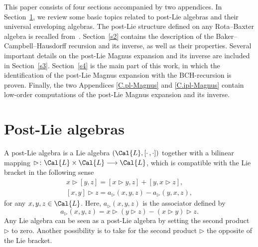 \documentclass[10pt,a4paper]{amsart}
\numberwithin{equation}{section}
\begin{document}
This paper consists of four sections accompanied by two appendices. In Section~\ref{s1}, we review some basic topics related to post-Lie algebras and their universal enveloping algebras. The post-Lie structure defined on any Rota--Baxter algebra is recalled from~\cite{BGN10}. Section~\ref{s2} contains the description of the Baker--Campbell--Hausdorff recursion and its inverse, as well as their properties. Several important details on the post-Lie Magnus expansion and its inverse are included in Section~\ref{s3}. Section~\ref{s4} is the main part of this work, in which the identification of the post-Lie Magnus expansion with the BCH-recursion is proven. Finally, the two Appendices \ref{C.pl-Magnus} and \ref{C.ipl-Magnus} contain low-order computations of the post-Lie Magnus expansion and its inverse.

\section{Post-Lie algebras}\label{s1}

A post-Lie algebra is a Lie algebra $(\Cal{L},[\cdot\,,\cdot])$ together with a bilinear mapping $\rhd\colon \Cal{L} \times \Cal{L} \longrightarrow \Cal{L}$, which is compatible with the Lie bracket in the following sense
\begin{gather}\label{eq1}
x \rhd [y,z] = [x\rhd y,z]+ [y, x \rhd z],
\\
\label{eq2}
[x,y]\rhd z = a_{\rhd}(x,y,z)-a_{\rhd}(y,x,z),
\end{gather}
for any $x, y, z \in \Cal{L}$. Here, $a_{\rhd}(x,y,z)$ is the associator defined by
\begin{displaymath}
a_{\rhd}(x,y,z)=x \rhd (y \rhd z) - (x \rhd y) \rhd z.
\end{displaymath}
Any Lie algebra can be seen as a post-Lie algebra by setting the second product $\rhd$ to zero. Another possibility is to take for the second product $\rhd$ the opposite of the Lie bracket.
\end{document}
